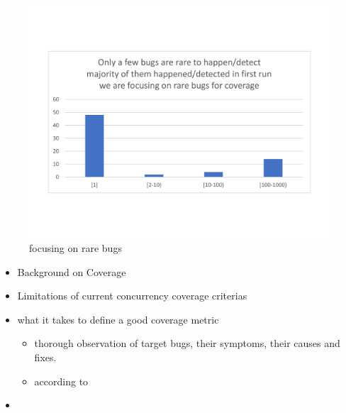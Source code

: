 
\begin{figure}
\centering
  \includegraphics[width=.95\linewidth]{figs/coverage_motivation_tentative.pdf}
  \caption{focusing on rare bugs}
  \label{fig:rare_bugs}
\end{figure}

\begin{itemize}
  \item Background on Coverage
  \item Limitations of current concurrency coverage criterias
  \item what it takes to define a good coverage metric
  \begin{itemize}
    \item thorough observation of target bugs, their symptoms, their causes and fixes.
    \item according to \cite{}
  \end{itemize}
  \item
\end{itemize}

